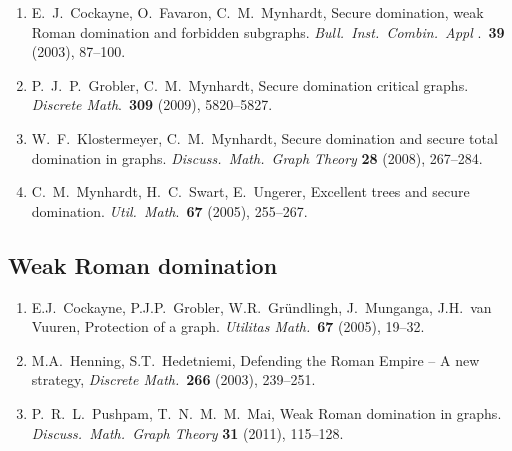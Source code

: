 \documentclass[12pt]{article}%
\begin{document}
\begin{enumerate}
\item E.~J.~Cockayne, O.~Favaron, C.~M.~Mynhardt, Secure domination, weak
Roman domination and forbidden subgraphs. \emph{Bull.~Inst.~Combin.~Appl}%
.~\textbf{39} (2003), 87--100.

\item P.~J.~P.~Grobler, C.~M.~Mynhardt, Secure domination critical graphs.
\emph{Discrete Math}.~\textbf{309} (2009), 5820--5827.

\item W.~F.~Klostermeyer, C.~M.~Mynhardt, Secure domination and secure total
domination in graphs. \emph{Discuss.~Math.~Graph Theory} \textbf{28} (2008), 267--284.

\item C.~M.~Mynhardt, H.~C.~Swart, E.~Ungerer, Excellent trees and secure
domination. \emph{Util.~Math}.~\textbf{67} (2005), 255--267.
\end{enumerate}

\subsection*{Weak Roman domination}

\begin{enumerate}
\item E.J.~Cockayne, P.J.P.~Grobler, W.R.~Gr\"{u}ndlingh, J.~Munganga,
J.H.~van Vuuren, Protection of a graph. \emph{Utilitas Math.}~\textbf{67
}(2005), 19--32.

\item M.A.~Henning, S.T.~Hedetniemi, Defending the Roman Empire -- A new
strategy, \emph{Discrete Math.}~\textbf{266} (2003), 239--251.

\item P.~R.~L.~Pushpam, T.~N.~M.~M.~Mai, Weak Roman domination in graphs.
\emph{Discuss.~Math.~Graph Theory} \textbf{31} (2011), 115--128.
\end{enumerate}
\end{document}
